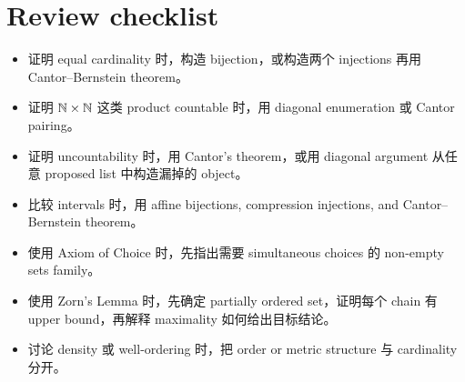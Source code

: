 \section{Review checklist}

\begin{itemize}
  \item 证明 equal cardinality 时，构造 bijection，或构造两个 injections 再用
  Cantor--Bernstein theorem。
  \item 证明 \(\mathbb{N}\times\mathbb{N}\) 这类 product countable 时，用 diagonal
  enumeration 或 Cantor pairing。
  \item 证明 uncountability 时，用 Cantor's theorem，或用 diagonal argument
  从任意 proposed list 中构造漏掉的 object。
  \item 比较 intervals 时，用 affine bijections, compression injections,
  and Cantor--Bernstein theorem。
  \item 使用 Axiom of Choice 时，先指出需要 simultaneous choices 的
  non-empty sets family。
  \item 使用 Zorn's Lemma 时，先确定 partially ordered set，证明每个 chain
  有 upper bound，再解释 maximality 如何给出目标结论。
  \item 讨论 density 或 well-ordering 时，把 order or metric structure 与
  cardinality 分开。
\end{itemize}
